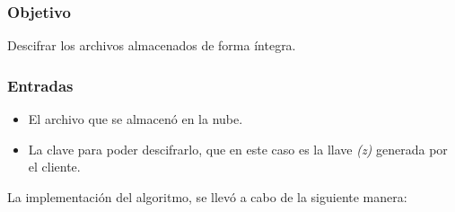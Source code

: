 \subsubsection{Objetivo}
Descifrar los archivos almacenados de forma íntegra.

\subsubsection{Entradas}
	\begin{itemize}
		\item El archivo que se almacenó en la nube.
		\item La clave para poder descifrarlo, que en este caso es la llave \textit{(z)} generada por el cliente.
	\end{itemize}

La implementación del algoritmo, se llevó a cabo de la siguiente manera: 

